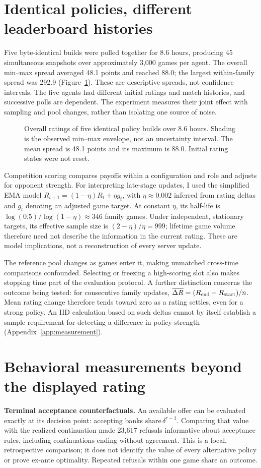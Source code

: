 \section{Identical policies, different leaderboard histories}
Five byte-identical builds were polled together for 8.6 hours, producing 45
simultaneous snapshots over approximately 3,000 games per agent. The overall
min--max spread averaged 48.1 points and reached 88.0; the largest within-family
spread was 292.9 (Figure~\ref{fig:noise}). These are descriptive spreads, not
confidence intervals. The five agents had different initial ratings and match
histories, and successive polls are dependent. The experiment measures their
joint effect with sampling and pool changes, rather than isolating one source
of noise.

\begin{figure}[t]
\centering

\caption{Overall ratings of five identical policy builds over 8.6 hours.
Shading is the observed min--max envelope, not an uncertainty interval.
The mean spread is 48.1 points and its maximum is 88.0. Initial rating states
were not reset.}
\label{fig:noise}
\end{figure}

Competition scoring compares payoffs within a configuration and role and adjusts
for opponent strength. For interpreting late-stage updates, I used the simplified
EMA model $R_{t+1}=(1-\eta)R_t+\eta g_t$, with $\eta\approx0.002$ inferred from
rating deltas and $g_t$ denoting an adjusted game target. At constant $\eta$, its
half-life is $\log(0.5)/\log(1-\eta)\approx346$ family games. Under independent,
stationary targets, its effective sample size is $(2-\eta)/\eta=999$; lifetime
game volume therefore need not describe the information in the current rating.
These are model implications, not a reconstruction of every server update.

The reference pool changes as games enter it, making unmatched cross-time
comparisons confounded. Selecting or freezing a high-scoring slot also makes
stopping time part of the evaluation protocol. A further distinction concerns
the outcome being tested: for consecutive family updates,
\mbox{$\overline{\Delta R}=(R_{\rm end}-R_{\rm start})/n$}.
Mean rating change therefore tends toward zero as a rating settles, even for
a strong policy. An IID calculation based on such deltas cannot by itself
establish a sample requirement for detecting a difference in policy strength
(Appendix~\ref{app:measurement}).

\section{Behavioral measurements beyond the displayed rating}
\textbf{Terminal acceptance counterfactuals.} An available offer can be evaluated
exactly at its decision point: accepting banks
$\mathrm{share}\,\delta^{r-1}$. Comparing that value with the realized continuation
made 23,617 refusals informative about acceptance rules, including continuations
ending without agreement. This is a local, retrospective comparison; it does not
identify the value of every alternative policy or prove ex-ante optimality.
Repeated refusals within one game share an outcome.

